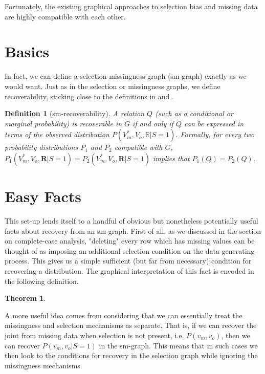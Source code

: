 \documentclass[12pt,twoside]{reedthesis}
\newtheorem{theorem}{Theorem}
\newtheorem{definition}{Definition}[section]
\theoremstyle{definition}
\begin{document}
Fortunately, the existing graphical approaches to selection bias  and missing data  are highly compatible with each other. 

\section{Basics}

In fact, we can define a selection-missingness graph (sm-graph) exactly as we would want. Just as in the selection or missingness graphs, we define recoverability, sticking close to the definitions in \cite{Mohan_2013} and \citep{Bareinboim_2014}.

\begin{definition}[sm-recoverability]
A relation $Q$ (such as a conditional or marginal probability) is recoverable in $G$ if and only if $Q$ can be expressed in terms of the observed distribution $P(V^*_m, V_o, \mathbb{R}| S=1)$. Formally, for every two probability distributions $P_1$ and $P_2$ compatible with $G$, $P_1(V^*_m, V_o, \mathbf{R}| S=1) = P_2(V^*_m, V_o, \mathbf{R}| S=1)$ implies that $P_1(Q) = P_2(Q)$.
\end{definition}
\section{Easy Facts}


This set-up lends itself to a handful of obvious but nonetheless potentially useful facts about recovery from an sm-graph. First of all, as we discussed in the section on complete-case analysis, "deleting" every row which has missing values can be thought of as imposing an additional selection condition on the data generating process. This gives us a simple sufficient (but far from necessary) condition for recovering a distribution. The graphical interpretation of this fact is encoded in the following definition.


\begin{theorem}

\end{theorem}

A more useful idea comes from considering that we can essentially treat the missingness and selection mechanisms as separate. That is, if we can recover the joint from missing data when selection is not present, i.e. $P(v_m, v_o )$, then we can recover $P(v_m, v_o | S = 1)$ in the sm-graph. This means that in such cases we then look to the conditions for recovery in the selection graph while ignoring the missingness mechanisms.
\end{document}
